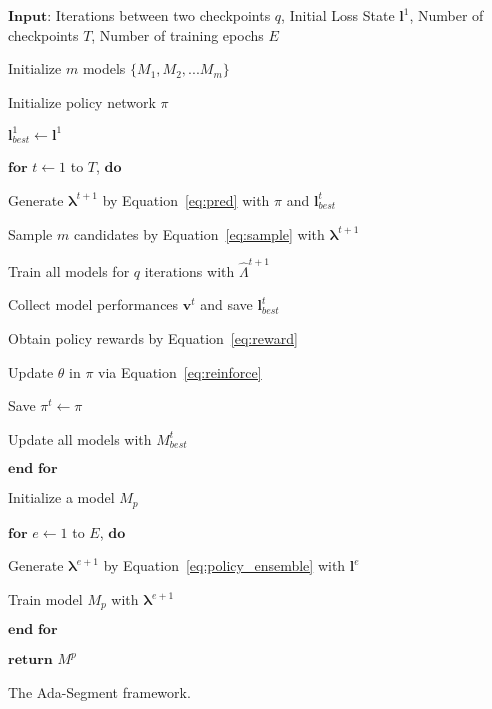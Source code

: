 \documentclass[letterpaper]{article} \usepackage{aaai21}  \usepackage{times}  \usepackage{helvet} \usepackage{courier}  \usepackage[hyphens]{url}  \usepackage{graphicx} \urlstyle{rm} \def\UrlFont{\rm}  \usepackage{natbib}  \usepackage{caption} \frenchspacing  \setlength{\pdfpagewidth}{8.5in}  \setlength{\pdfpageheight}{11in}
\begin{document}
\begin{algorithm}
$\textbf{Input}$: Iterations between two checkpoints $q$, Initial Loss State $\boldsymbol{l}^1$, 
  Number of checkpoints $T$, Number of training epochs $E$
  
  \quad Initialize $m$ models $\{M_1,M_2,...M_m\}$

  \quad Initialize policy network $\pi$







  \quad $\boldsymbol{l}_{best}^1 \leftarrow \boldsymbol{l}^1$

  \quad $\textbf{for}$ $t \leftarrow 1$ to $T$, $\textbf{do}$
  
  \quad \quad Generate $\boldsymbol{\lambda}^{t+1}$ by Equation~\ref{eq:pred} 
  with $\pi$ and $\boldsymbol{l}_{best}^t$

  \quad \quad Sample $m$ candidates by 
  Equation~\ref{eq:sample} with $\boldsymbol{\lambda}^{t+1}$
  
  \quad \quad Train all models for $q$ iterations with $\hat\Lambda^{t+1}$

  \quad \quad Collect model performances $\boldsymbol{v}^t$ and save $\boldsymbol{l}_{best}^t$

  \quad \quad Obtain policy rewards by Equation~\ref{eq:reward}
  
  \quad \quad Update $\theta$ in $\pi$ via Equation~\ref{eq:reinforce}

  \quad \quad Save $\pi^t \leftarrow \pi$
  
  \quad \quad Update all models 
with
  $M_{best}^{t}$



















  \quad $\textbf{end for}$

  \quad Initialize a model $M_{p}$

  \quad $\textbf{for}$ $e \leftarrow 1$ to $E$, $\textbf{do}$

  \quad \quad Generate $\boldsymbol{\lambda}^{e+1}$ by Equation~\ref{eq:policy_ensemble} with $\boldsymbol{l}^e$

  \quad \quad Train model $M_{p}$ with $\boldsymbol{\lambda}^{e+1}$

  \quad $\textbf{end for}$
  
  $\textbf{return}$ $M^p$
  \caption{The Ada-Segment framework. }
  \label{alg1}
\end{algorithm}
\end{document}
